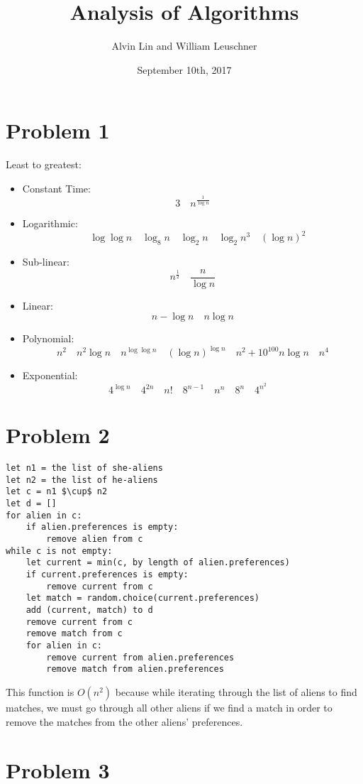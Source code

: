 \documentclass[letterpaper, 12pt]{math}
\title{Analysis of Algorithms}
\author{Alvin Lin and William Leuschner}
\date{September 10th, 2017}
\begin{document}
\maketitle

\section*{Problem 1}
Least to greatest:
\begin{itemize}
  \item Constant Time:
  \[ 3 \quad n^{\frac{1}{\log n}} \]
  \item Logarithmic:
  \[ \quad \log\log n \quad \log_8 n \quad \log_2 n \quad \log_2 n^3 \quad
    (\log n)^2 \]
  \item Sub-linear:
  \[ n^{\frac{1}{2}} \quad \frac{n}{\log n} \]
  \item Linear:
  \[ n-\log n \quad n\log n \]
  \item Polynomial:
  \[ n^2 \quad n^2\log n \quad n^{\log\log n} \quad (\log n)^{\log n} \quad
    n^2+10^{100}n\log n \quad n^4 \]
  \item Exponential:
  \[ 4^{\log n} \quad 4^{2n} \quad n! \quad 8^{n-1} \quad n^n\quad 8^n \quad
    4^{n^2} \quad \]
\end{itemize}

\section*{Problem 2}
\begin{lstlisting}[mathescape=true]
let n1 = the list of she-aliens
let n2 = the list of he-aliens
let c = n1 $\cup$ n2
let d = []
for alien in c:
    if alien.preferences is empty:
        remove alien from c
while c is not empty:
    let current = min(c, by length of alien.preferences)
    if current.preferences is empty:
        remove current from c
    let match = random.choice(current.preferences)
    add (current, match) to d
    remove current from c
    remove match from c
    for alien in c:
        remove current from alien.preferences
        remove match from alien.preferences
\end{lstlisting}
This function is \( O(n^2) \) because while iterating through the list of
aliens to find matches, we must go through all other aliens if we find a match
in order to remove the matches from the other aliens' preferences.

\section*{Problem 3}
\end{document}
